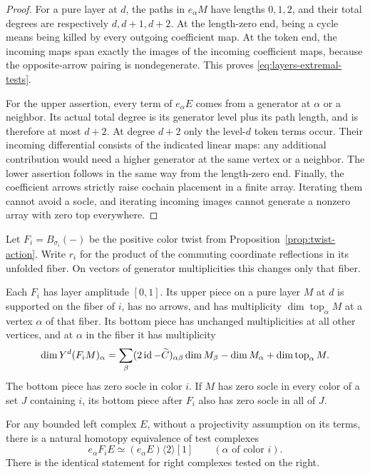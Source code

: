 \begin{proof}
For a pure layer at $d$, the paths in $e_\alpha M$ have lengths
$0,1,2$, and their total degrees are respectively $d,d+1,d+2$.
At the length-zero end, being a cycle means being killed by every
outgoing coefficient map.  At the token end, the incoming maps span
exactly the images of the incoming coefficient maps, because the
opposite-arrow pairing is nondegenerate.  This proves
\eqref{eq:layers-extremal-tests}.

For the upper assertion, every term of $e_\alpha E$ comes from a
generator at $\alpha$ or a neighbor.  Its actual total degree is its
generator level plus its path length, and is therefore at most
$d+2$.  At degree $d+2$ only the level-$d$ token terms occur.
Their incoming differential consists of the indicated linear maps:
any additional contribution would need a higher generator at the
same vertex or a neighbor.  The lower assertion follows in the same
way from the length-zero end.  Finally, the coefficient arrows
strictly raise cochain placement in a finite array.  Iterating them
cannot avoid a socle, and iterating incoming images cannot generate
a nonzero array with zero top everywhere.
\end{proof}

Let $F_i=B_{\sigma_i}(-)$ be the positive color twist from
Proposition~\ref{prop:twist-action}.  Write $r_i$ for the product of
the commuting coordinate reflections in its unfolded fiber.  On
vectors of generator multiplicities this changes only that fiber.

\begin{lemma}\label{lem:positive-layer}
Each $F_i$ has layer amplitude $[0,1]$.  Its upper piece on a pure
layer $M$ at $d$ is supported on the fiber of $i$, has no arrows,
and has multiplicity $\dim\operatorname{top}_\alpha M$ at a vertex
$\alpha$ of that fiber.  Its bottom piece has unchanged
multiplicities at all other vertices, and at $\alpha$ in the fiber
it has multiplicity
\begin{equation}
 \dim Y^d(F_iM)_\alpha
 =\sum_\beta(2\operatorname{id}-\widetilde C)_{\alpha\beta}
       \dim M_\beta
       -\dim M_\alpha+\dim\operatorname{top}_\alpha M.
 \label{eq:layers-positive-dimension}
\end{equation}
The bottom piece has zero socle in color $i$.  If $M$ has zero
socle in every color of a set $J$ containing $i$, its bottom piece
after $F_i$ also has zero socle in all of $J$.

For any bounded left complex $E$, without a projectivity assumption
on its terms, there is a natural homotopy equivalence of test
complexes
\begin{equation}
 e_\alpha F_iE\simeq(e_\alpha E)\langle2\rangle[1]
 \qquad(\alpha\text{ of color }i).
 \label{eq:layers-positive-test-shift}
\end{equation}
There is the identical statement for right complexes tested on the
right.
\end{lemma}

